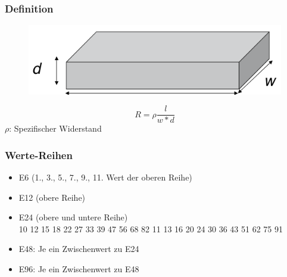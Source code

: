\subsubsection{Definition}
\begin{figure}[htbs]
\includegraphics[scale=0.5]{pictures/widerstand}
\end{figure}
\begin{equation}
R=\rho\frac{l}{w*d}
\end{equation}
$\rho$: Spezifischer Widerstand

\subsubsection{Werte-Reihen}
\begin{itemize}
  \item E6 (1., 3., 5., 7., 9., 11. Wert der oberen Reihe)
  \item E12 (obere Reihe)
  \item E24 (obere und untere Reihe)\\
  10 12 15 18 22 27 33 39 47 56 68 82 11  13 16 20 24 30 36 43 51 62 75 91
  \item E48: Je ein Zwischenwert zu E24
  \item E96: Je ein Zwischenwert zu E48
\end{itemize}

